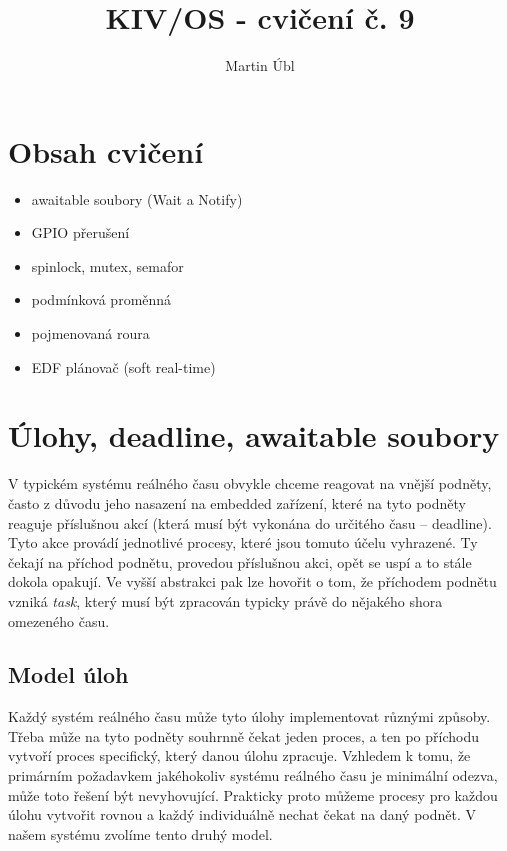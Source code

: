 \documentclass{article}
\author{Martin Úbl}
\title{KIV/OS - cvičení č. 9}
\begin{document}
\maketitle

\section{Obsah cvičení}

\begin{itemize}
	\item awaitable soubory (Wait a Notify)
	\item GPIO přerušení
	\item spinlock, mutex, semafor
	\item podmínková proměnná
	\item pojmenovaná roura
	\item EDF plánovač (soft real-time)
\end{itemize}

\section{Úlohy, deadline, awaitable soubory}

V typickém systému reálného času obvykle chceme reagovat na vnější podněty, často z důvodu jeho nasazení na embedded zařízení, které na tyto podněty reaguje příslušnou akcí (která musí být vykonána do určitého času -- deadline). Tyto akce provádí jednotlivé procesy, které jsou tomuto účelu vyhrazené. Ty čekají na příchod podnětu, provedou příslušnou akci,  opět se uspí a to stále dokola opakují. Ve vyšší abstrakci pak lze hovořit o tom, že příchodem podnětu vzniká \emph{task}, který musí být zpracován typicky právě do nějakého shora omezeného času.

\subsection{Model úloh}

Každý systém reálného času může tyto úlohy implementovat různými způsoby. Třeba může na tyto podněty souhrnně čekat jeden  proces, a ten po příchodu vytvoří proces specifický, který danou úlohu zpracuje. Vzhledem k tomu, že primárním požadavkem jakéhokoliv systému reálného času je minimální odezva, může toto řešení být nevyhovující. Prakticky proto můžeme procesy pro každou úlohu vytvořit rovnou a každý individuálně nechat čekat na daný podnět. V našem systému zvolíme tento druhý model.
\end{document}
